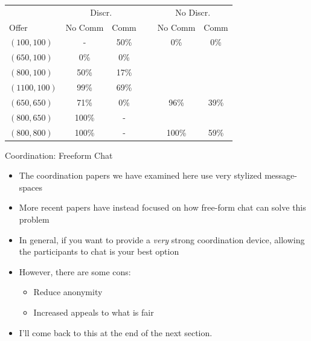 \documentclass{beamer}
\begin{document}
\begin{frame}
\begin{card}
	\begin{tabular}{lccccc}\hline
			&  \multicolumn{2}{c}{Discr.} &\  & \multicolumn{2}{c}{No Discr.}\\\cline{2-3} \cline{5-6}
			\multicolumn{1}{l}{Offer}  & \multicolumn{1}{c}{No Comm} & \multicolumn{1}{c}{Comm}  & & \multicolumn{1}{c}{No Comm} & \multicolumn{1}{c}{Comm}\\ \hline
			$(100,100)$  &  -  & 50\%  & & 0\%  &0\% \\
			$(650,100)$  &  0\%  & 0\%  \\
			$(800,100)$  &  50\%  & 17\%  \\
			$(1100,100)$ &  99\%  & 69\% \\ 
			$(650,650)$  &  71\%  & 0\% & & 96\%  & 39\%  \\ 
			$(800,650)$  &  100\%  & -  \\ 
			$(800,800)$  &  100\%  & - & & 100\%  & 59\% \\ \hline
		\end{tabular}
\end{card}
\end{frame}

\begin{frame}{Coordination: Freeform Chat}
\begin{card}
    \begin{itemize}
    	\item The coordination papers we have examined here use very stylized message-spaces
    	\item More recent papers have instead focused on how free-form chat can solve this problem
    	\item In general, if you want to provide a \emph{very} strong coordination device, allowing the participants to chat is your best option
    	\item However, there are some cons:
    	\begin{itemize}
    		\item Reduce anonymity
    		\item Increased appeals to what is fair
    	\end{itemize}
    	\item I'll come back to this at the end of the next section.
    \end{itemize}
\end{card}

\end{frame}
\end{document}
